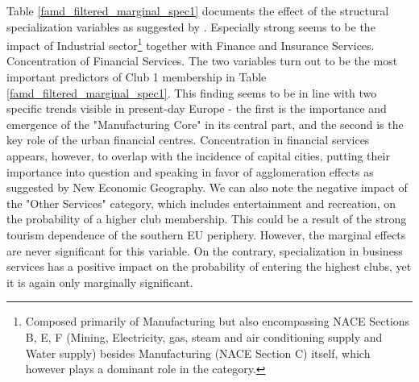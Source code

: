 \documentclass[11pt]{article}
\begin{document}
Table \ref{famd_filtered_marginal_spec1} documents the effect of the structural specialization variables as suggested by \citet{cutrini2019economic}. Especially strong seems to be the impact of Industrial sector\footnote{Composed primarily of Manufacturing but also encompassing NACE Sections B, E, F (Mining, Electricity, gas, steam and air conditioning supply and Water supply) besides Manufacturing (NACE Section C) itself, which however plays a dominant role in the category.} together with Finance and Insurance Services. Concentration of Financial Services. The two variables turn out to be the most important predictors of Club 1 membership in Table \ref{famd_filtered_marginal_spec1}. This finding seems to be in line with two specific trends visible in present-day Europe - the first is the importance and emergence of the "Manufacturing Core" in its central part, and the second is the key role of the urban financial centres. Concentration in financial services appears, however, to overlap with the incidence of capital cities, putting their importance into question and speaking in favor of agglomeration effects as suggested by New Economic Geography.
We can also note the negative impact of the "Other Services" category, which includes entertainment and recreation, on the probability of a higher club membership. This could be a result of the strong tourism dependence of the southern EU periphery. However, the marginal effects are never significant for this variable. On the contrary, specialization in business services has a positive impact on the probability of entering the highest clubs, yet it is again only marginally significant.
\end{document}
